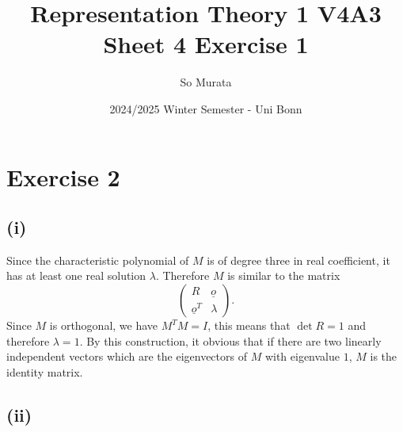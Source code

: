 \documentclass{article}
\title{Representation Theory 1 V4A3 Sheet 4 Exercise 1}
\author{So Murata}
\date{2024/2025 Winter Semester - Uni Bonn}
\numberwithin{equation}{section}
\begin{document}
\maketitle
\section*{Exercise 2}

\subsection*{(i)}

Since the characteristic polynomial of $M$ is of degree three in real coefficient, it has at least one real solution $\lambda$. Therefore $M$ is similar to the matrix
\begin{equation*}
\begin{pmatrix}
R&\underline{o}\\
\underline{o}^T&\lambda
\end{pmatrix}.
\end{equation*}
Since $M$ is orthogonal, we have $M^TM=I$, this means that $\det R=1$ and therefore $\lambda = 1$. By this construction, it obvious that if there are two linearly independent vectors which are the eigenvectors of $M$ with eigenvalue $1$, $M$ is the identity matrix.

\subsection*{(ii)}
\end{document}
